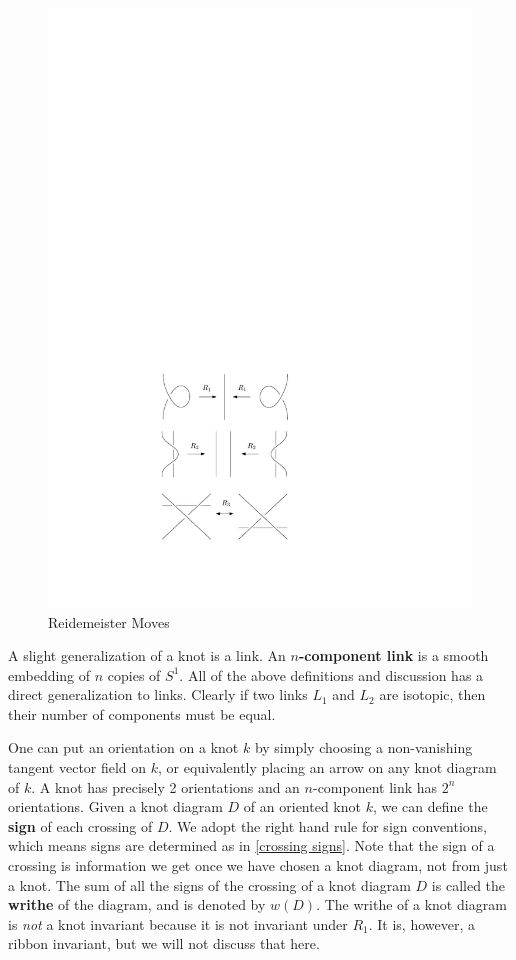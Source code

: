 \begin{figure}[tb]
\centering
\includegraphics[scale=1]{graphics/reidemeister-moves}
\caption{Reidemeister Moves}
\label{reidemeister moves}
\end{figure}

A slight generalization of a knot is a link. An \textbf{$n$-component link} is a smooth embedding of $n$ copies of $S^1$. All of the above definitions and discussion has a direct generalization to links. Clearly if two links $L_1$ and $L_2$ are isotopic, then their number of components must be equal.

One can put an orientation on a knot $k$ by simply choosing a non-vanishing tangent vector field on $k$, or equivalently placing an arrow on any knot diagram of $k$. A knot has precisely 2 orientations and an $n$-component link has $2^n$ orientations. Given a knot diagram $D$ of an oriented knot $k$, we can define the \textbf{sign} of each crossing of $D$. We adopt the right hand rule for sign conventions, which means signs are determined as in \cref{crossing signs}. Note that the sign of a crossing is information we get once we have chosen a knot diagram, not from just a knot. The sum of all the signs of the crossing of a knot diagram $D$ is called the \textbf{writhe} of the diagram, and is denoted by $w(D)$. The writhe of a knot diagram is \emph{not} a knot invariant because it is not invariant under $R_1$. It is, however, a ribbon invariant, but we will not discuss that here.

